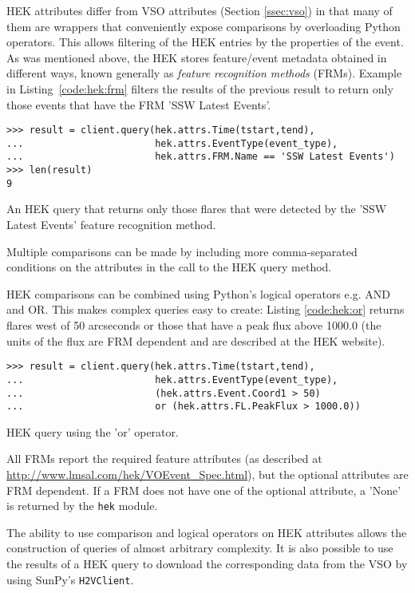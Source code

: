 HEK attributes differ from VSO attributes (Section \ref{ssec:vso}) in that many 
of them are wrappers that conveniently expose comparisons by overloading Python 
operators. This allows filtering of the HEK entries by the properties of the 
event. As was mentioned above, the HEK stores feature/event metadata obtained 
in different ways, known generally as {\it feature recognition methods} (FRMs). 
Example in Listing~\ref{code:hek:frm} filters the results of the previous 
result to return only those events that have the FRM 'SSW Latest Events'.
\begin{listing}[H]
\begin{verbatim}
>>> result = client.query(hek.attrs.Time(tstart,tend), 
...                       hek.attrs.EventType(event_type),
...                       hek.attrs.FRM.Name == 'SSW Latest Events')
>>> len(result)
9
\end{verbatim}
\caption{An HEK query that returns only those flares that were
  detected by the 'SSW Latest Events' feature recognition method.}
\label{code:hek:frm}
\end{listing}
Multiple comparisons can be made by including more comma-separated
conditions on the attributes in the call to the HEK query method.

HEK comparisons can be combined using Python’s logical operators e.g. AND
and OR. This makes complex queries easy to create: Listing \ref{code:hek:or} 
returns flares west of 50 arcseconds or those that have a peak flux above 
1000.0 (the units of the flux are FRM dependent and are described at the HEK 
website).
\begin{listing}[H]
\begin{verbatim}
>>> result = client.query(hek.attrs.Time(tstart,tend), 
...                       hek.attrs.EventType(event_type),
...                       (hek.attrs.Event.Coord1 > 50) 
...                       or (hek.attrs.FL.PeakFlux > 1000.0))
\end{verbatim}
\caption{HEK query using the 'or' operator.}
\label{code:hek:or}
\end{listing}
All FRMs report the required feature attributes (as described at 
\url{http://www.lmsal.com/hek/VOEvent_Spec.html}), but the optional attributes 
are FRM dependent.  If a FRM does not have one of the optional attribute, a 
'None' is returned by the \texttt{hek} module. 

The ability to use comparison and logical operators on HEK attributes allows 
the construction of queries of almost arbitrary complexity. 
It is also possible to use the results of a HEK query to download the 
corresponding data from the VSO by using SunPy's \texttt{H2VClient}.

